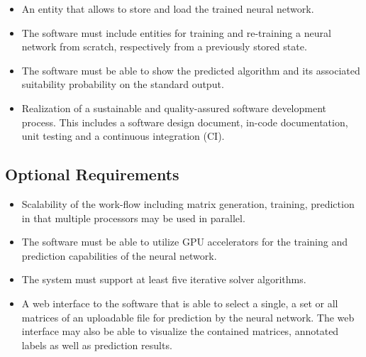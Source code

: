 \documentclass[parskip=full]{scrartcl}
\begin{document}
\begin{itemize}
\item An entity that allows to store and load the trained \gls{neural network}.

\item The software must include entities for training and re-training a \gls{neural network} from scratch, respectively from a previously stored state.

\item The software must be able to show the predicted \gls{algorithm} and its associated suitability probability on the standard output.

\item Realization of a sustainable and quality-assured software development process. This includes a software design document, in-code documentation, unit testing and a continuous integration (CI).

\end{itemize}

\subsection{Optional Requirements}

\begin{itemize}
    
\item Scalability of the work-flow including matrix generation, training, prediction in that multiple processors may be used in parallel.

\item The software must be able to utilize \gls{GPU} accelerators for the training and prediction capabilities of the \gls{neural network}.

\item The system must support at least five \gls{iterative solver} \glspl{algorithm}.

\item A web interface to the software that is able to select a single, a set or all matrices of an uploadable file for prediction by the \gls{neural network}. The web interface may also be able to visualize the contained matrices, annotated labels as well as prediction results.

\end{itemize}
\end{document}
